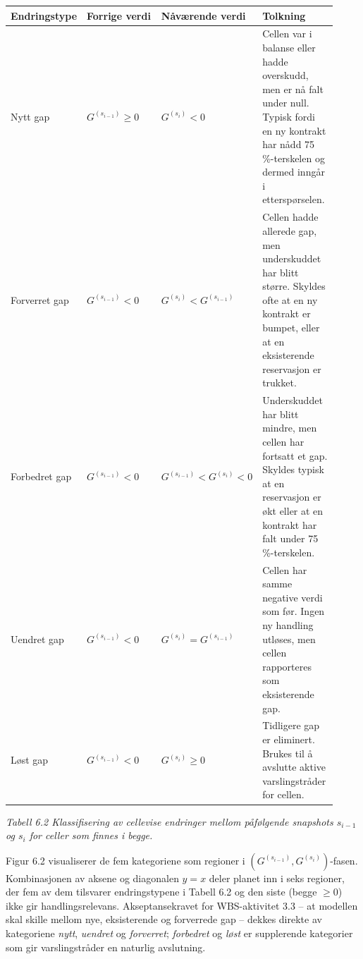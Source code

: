 \documentclass[a4paper,11pt]{article}
\begin{document}
\begin{longtable}{|>{\RaggedRight}p{0.230\linewidth}|>{\RaggedRight}p{0.230\linewidth}|>{\RaggedRight}p{0.230\linewidth}|>{\RaggedRight}p{0.230\linewidth}|}
\hline
\textbf{Endringstype} & \textbf{Forrige verdi} & \textbf{Nåværende verdi} & \textbf{Tolkning} \\
\hline
\endhead
Nytt gap & $G^{(s_{i-1})} \geq 0$ & $G^{(s_i)} < 0$ & Cellen var i balanse eller hadde overskudd, men er nå falt under null. Typisk fordi en ny kontrakt har nådd 75 \%-terskelen og dermed inngår i etterspørselen. \\
\hline
Forverret gap & $G^{(s_{i-1})} < 0$ & $G^{(s_i)} < G^{(s_{i-1})}$ & Cellen hadde allerede gap, men underskuddet har blitt større. Skyldes ofte at en ny kontrakt er bumpet, eller at en eksisterende reservasjon er trukket. \\
\hline
Forbedret gap & $G^{(s_{i-1})} < 0$ & $G^{(s_{i-1})} < G^{(s_i)} < 0$ & Underskuddet har blitt mindre, men cellen har fortsatt et gap. Skyldes typisk at en reservasjon er økt eller at en kontrakt har falt under 75 \%-terskelen. \\
\hline
Uendret gap & $G^{(s_{i-1})} < 0$ & $G^{(s_i)} = G^{(s_{i-1})}$ & Cellen har samme negative verdi som før. Ingen ny handling utløses, men cellen rapporteres som eksisterende gap. \\
\hline
Løst gap & $G^{(s_{i-1})} < 0$ & $G^{(s_i)} \geq 0$ & Tidligere gap er eliminert. Brukes til å avslutte aktive varslingstråder for cellen. \\
\hline
\end{longtable}

\begin{center}\small\textit{Tabell 6.2 Klassifisering av cellevise endringer mellom påfølgende snapshots $s_{i-1}$ og $s_i$ for celler som finnes i begge.}\end{center}

Figur 6.2 visualiserer de fem kategoriene som regioner i $(G^{(s_{i-1})}, G^{(s_i)})$-fasen. Kombinasjonen av aksene og diagonalen $y = x$ deler planet inn i seks regioner, der fem av dem tilsvarer endringstypene i Tabell 6.2 og den siste (begge $\geq 0$) ikke gir handlingsrelevans. Akseptansekravet for WBS-aktivitet 3.3 – at modellen skal skille mellom nye, eksisterende og forverrede gap – dekkes direkte av kategoriene \textit{nytt}, \textit{uendret} og \textit{forverret}; \textit{forbedret} og \textit{løst} er supplerende kategorier som gir varslingstråder en naturlig avslutning.
\end{document}
